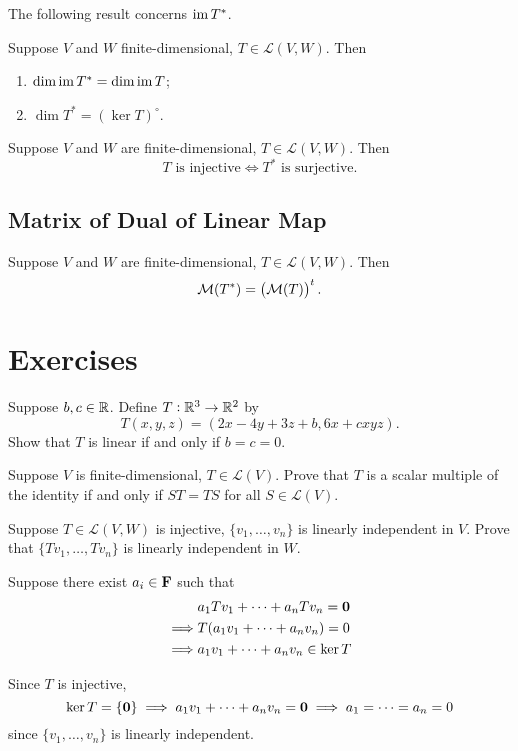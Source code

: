 The following result concerns $\operatorname{im} T^*$.

\begin{proposition}
Suppose $V$ and $W$ finite-dimensional, $T\in\mathcal{L}(V,W)$. Then
\begin{enumerate}[label=(\roman*)]
\item $\dim\operatorname{im} T^*=\dim\operatorname{im} T$;
\item $\dim T^*=(\ker T)^\circ$.
\end{enumerate}
\end{proposition}

\begin{proposition}
Suppose $V$ and $W$ are finite-dimensional, $T\in\mathcal{L}(V,W)$. Then
\[T\text{ is injective}\iff T^*\text{ is surjective.}\]
\end{proposition}

\subsection{Matrix of Dual of Linear Map}
\begin{proposition}
Suppose $V$ and $W$ are finite-dimensional, $T\in\mathcal{L}(V,W)$. Then
\[\mathcal{M}(T^*)=\left(\mathcal{M}(T)\right)^t.\]
\end{proposition}


\pagebreak

\section*{Exercises}
\begin{exercise}
Suppose $b,c\in\mathbb R$. Define $T:\mathbb R^3\to\mathbb R^2$ by
\[T(x,y,z)=(2x-4y+3z+b,6x+cxyz).\]
Show that $T$ is linear if and only if $b=c=0$.
\end{exercise}

\begin{exercise}
Suppose $V$ is finite-dimensional, $T\in\mathcal{L}(V)$. Prove that $T$ is a scalar multiple of the identity if and only if $ST=TS$ for all $S\in\mathcal{L}(V)$.
\end{exercise}

\begin{exercise}
Suppose $T\in\mathcal{L}(V,W)$ is injective, $\{v_1,\dots,v_n\}$ is linearly independent in $V$. Prove that $\{Tv_1,\dots,Tv_n\}$ is linearly independent in $W$.
\end{exercise}

\begin{solution}
Suppose there exist $a_i\in\mathbf F$ such that
\begin{align*}
&a_1Tv_1+\cdots+a_nTv_n=\vb{0}\\
\implies&T(a_1v_1+\cdots+a_nv_n)=0\\
\implies&a_1v_1+\cdots+a_nv_n\in\ker T
\end{align*}

Since $T$ is injective,
\[\ker T=\{\vb{0}\}\implies a_1v_1+\cdots+a_nv_n=\vb{0}\implies a_1=\cdots=a_n=0\]
since $\{v_1,\dots,v_n\}$ is linearly independent.
\end{solution}

